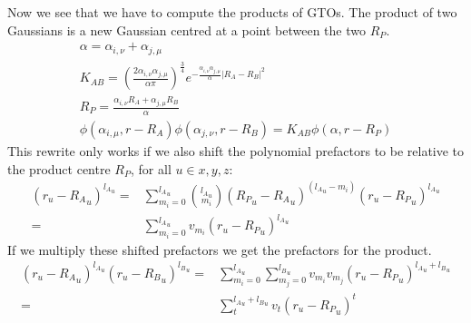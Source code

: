 Now we see that we have to compute the products of GTOs. The product of two Gaussians is a new Gaussian centred at a point between the two $R_P$.
\begin{gather}
    \alpha = \alpha_{i,\nu}+\alpha_{j,\mu}\\
    K_{AB} = \left(\frac{2\alpha_{i,\nu}\alpha_{j,\mu}}{\alpha\pi}\right)^\frac{3}{4}e^{-\frac{\alpha_{i,\nu}\alpha_{j,\mu}}{\alpha}|R_A-R_B|^2}\\
    R_P = \frac{\alpha_{i,\nu}R_A+\alpha_{j,\mu}R_B}{\alpha}\\
    \phi(\alpha_{i,\mu},r-R_A)\phi(\alpha_{j,\nu},r-R_B) = K_{AB}\phi(\alpha,r-R_P)
\end{gather}
This rewrite only works if we also shift the polynomial prefactors to be relative to the product centre $R_P$, for all $u\in x,y,z$:
\begin{equation}
\begin{split}
    (r_u-{R_A}_u)^{{l_A}_u} = &\sum_{m_i=0}^{{l_A}_u}\binom{{l_A}_u}{m_i}({R_P}_u-{R_A}_u)^{({l_A}_u-m_i)}(r_u-{R_P}_u)^{{l_A}_u}\\
    =&\sum_{m_i=0}^{{l_A}_u}v_{m_i}(r_u-{R_P}_u)^{{l_A}_u}
\end{split}
\end{equation}
If we multiply these shifted prefactors we get the prefactors for the product. 
\begin{equation}
\begin{split}
    (r_u-{R_A}_u)^{{l_A}_u}(r_u-{R_B}_u)^{{l_B}_u} = &\sum_{m_i=0}^{{l_A}_u}\sum_{m_j=0}^{{l_B}_u}v_{m_i}v_{m_j}(r_u-{R_P}_u)^{{l_A}_u+{l_B}_u}\\
    =&\sum_t^{{l_A}_u+{l_B}_u}v_t(r_u-{R_P}_u)^t
\end{split}
\end{equation}

